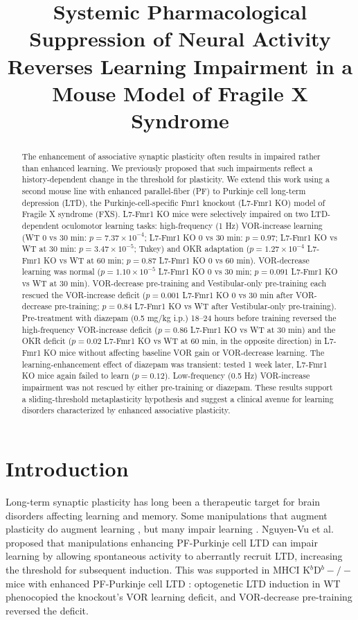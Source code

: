\documentclass[11pt]{article}
\title{Systemic Pharmacological Suppression of Neural Activity Reverses Learning Impairment in a Mouse Model of Fragile X Syndrome}
\author{}
\date{}
\begin{document}
\maketitle

\begin{abstract}
The enhancement of associative synaptic plasticity often results in impaired rather than enhanced learning. We previously proposed that such impairments reflect a history-dependent change in the threshold for plasticity. We extend this work using a second mouse line with enhanced parallel-fiber (PF) to Purkinje cell long-term depression (LTD), the Purkinje-cell-specific Fmr1 knockout (L7-Fmr1 KO) model of Fragile X syndrome (FXS). L7-Fmr1 KO mice were selectively impaired on two LTD-dependent oculomotor learning tasks: high-frequency (1 Hz) VOR-increase learning (WT 0 vs 30 min: $p = 7.37\times10^{-4}$; L7-Fmr1 KO 0 vs 30 min: $p = 0.97$; L7-Fmr1 KO vs WT at 30 min: $p = 3.47\times10^{-5}$; Tukey) and OKR adaptation ($p = 1.27\times10^{-4}$ L7-Fmr1 KO vs WT at 60 min; $p = 0.87$ L7-Fmr1 KO 0 vs 60 min). VOR-decrease learning was normal ($p = 1.10\times10^{-5}$ L7-Fmr1 KO 0 vs 30 min; $p = 0.091$ L7-Fmr1 KO vs WT at 30 min). VOR-decrease pre-training and Vestibular-only pre-training each rescued the VOR-increase deficit ($p = 0.001$ L7-Fmr1 KO 0 vs 30 min after VOR-decrease pre-training; $p = 0.84$ L7-Fmr1 KO vs WT after Vestibular-only pre-training). Pre-treatment with diazepam (0.5 mg/kg i.p.) 18--24 hours before training reversed the high-frequency VOR-increase deficit ($p = 0.86$ L7-Fmr1 KO vs WT at 30 min) and the OKR deficit ($p = 0.02$ L7-Fmr1 KO vs WT at 60 min, in the opposite direction) in L7-Fmr1 KO mice without affecting baseline VOR gain or VOR-decrease learning. The learning-enhancement effect of diazepam was transient: tested 1 week later, L7-Fmr1 KO mice again failed to learn ($p = 0.12$). Low-frequency (0.5 Hz) VOR-increase impairment was not rescued by either pre-training or diazepam. These results support a sliding-threshold metaplasticity hypothesis and suggest a clinical avenue for learning disorders characterized by enhanced associative plasticity.
\end{abstract}

\section{Introduction}
Long-term synaptic plasticity has long been a therapeutic target for brain disorders affecting learning and memory. Some manipulations that augment plasticity do augment learning \cite{tang1999genetic,vanpraag1999running,lee2009learning}, but many impair learning \cite{migaud1998enhanced,uetani2000impaired,gu2002protein,cox2003visual,rutten2008enhanced,navakkode2022parvalbumin}. Nguyen-Vu et al. \cite{nguyenvu2017saturation} proposed that manipulations enhancing PF-Purkinje cell LTD can impair learning by allowing spontaneous activity to aberrantly recruit LTD, increasing the threshold for subsequent induction. This was supported in MHCI K$^b$D$^b-/-$ mice with enhanced PF-Purkinje cell LTD \cite{mcconnell2009mhci}: optogenetic LTD induction in WT phenocopied the knockout's VOR learning deficit, and VOR-decrease pre-training reversed the deficit.
\end{document}
